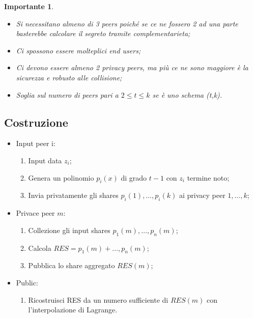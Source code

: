 \documentclass{book}
\newtheorem*{Importante}{\textbf{Importante}}
\begin{document}
\begin{Importante}
    \begin{itemize}
        \item Si necessitano almeno di 3 peers poiché se ce ne fossero 2 ad una parte basterebbe calcolare il segreto tramite complementarieta;
        \item Ci spossono essere molteplici end users;
        \item Ci devono essere almeno 2 privacy peers, ma più ce ne sono maggiore è la sicurezza e robusto alle collisione;
        \item Soglia sul numero di peers pari a \(2\leq t\leq k\) se è uno schema (t,k).
    \end{itemize}
\end{Importante}
\subsection{Costruzione}
\begin{itemize}
    \item Input peer i:\begin{enumerate}
              \item Input data \(z_{i}\);
              \item Genera un polinomio \(p_{i}(x)\) di grado \(t-1\) con \(z_{i}\) termine noto;
              \item Invia privatamente gli shares \(p_{i}(1),\dots,p_{i}(k)\) ai privacy peer \(1,\dots,k\);
          \end{enumerate}
    \item Privace peer \(m\):\begin{enumerate}
              \item Collezione gli input shares \(p_{1}(m),\dots,p_{n}(m)\);
              \item Calcola \(RES=p_{1}(m)+\dots,p_{n}(m)\);
              \item Pubblica lo share aggregato \(RES(m)\);
          \end{enumerate}
    \item Public:\begin{enumerate}
              \item Ricostruisci RES da un numero sufficiente di \(RES(m)\) con l'interpolazione di Lagrange.
          \end{enumerate}
\end{itemize}
\end{document}
